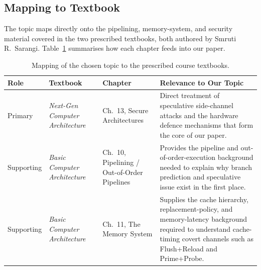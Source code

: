 \documentclass[11pt,a4paper]{article}
\begin{document}
\subsection{Mapping to Textbook}

The topic maps directly onto the pipelining, memory-system, and security material
covered in the two prescribed textbooks, both authored by Smruti R.\ Sarangi.
Table~\ref{tab:mapping} summarises how each chapter feeds into our paper.

\begin{table}[h]
\centering
\begin{tabular}{@{}p{2cm}p{3.6cm}p{3.6cm}p{5.5cm}@{}}
\toprule
\textbf{Role} & \textbf{Textbook} & \textbf{Chapter} & \textbf{Relevance to Our Topic} \\
\midrule
Primary & \textit{Next-Gen Computer Architecture}~\cite{sarangi2023nextgen} & Ch.~13, Secure Architectures & Direct treatment of speculative side-channel attacks and the hardware defence mechanisms that form the core of our paper. \\
\addlinespace
Supporting & \textit{Basic Computer Architecture}~\cite{sarangi2025basic} & Ch.~10, Pipelining / Out-of-Order Pipelines & Provides the pipeline and out-of-order-execution background needed to explain why branch prediction and speculative issue exist in the first place. \\
\addlinespace
Supporting & \textit{Basic Computer Architecture}~\cite{sarangi2025basic} & Ch.~11, The Memory System & Supplies the cache hierarchy, replacement-policy, and memory-latency background required to understand cache-timing covert channels such as Flush+Reload and Prime+Probe. \\
\bottomrule
\end{tabular}
\caption{Mapping of the chosen topic to the prescribed course textbooks.}
\label{tab:mapping}
\end{table}


\end{document}
